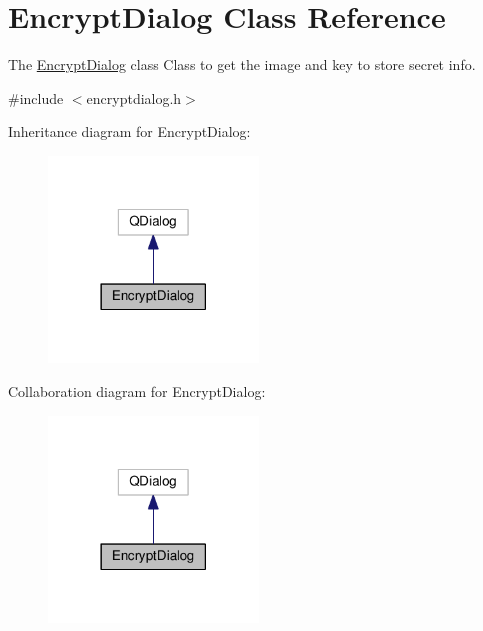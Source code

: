 \hypertarget{class_encrypt_dialog}{}\section{Encrypt\+Dialog Class Reference}
\label{class_encrypt_dialog}


The \hyperlink{class_encrypt_dialog}{Encrypt\+Dialog} class Class to get the image and key to store secret info.  




{\ttfamily \#include $<$encryptdialog.\+h$>$}



Inheritance diagram for Encrypt\+Dialog\+:
\nopagebreak
\begin{figure}[H]
\begin{center}
\leavevmode
\includegraphics[width=158pt]{class_encrypt_dialog__inherit__graph}
\end{center}
\end{figure}


Collaboration diagram for Encrypt\+Dialog\+:
\nopagebreak
\begin{figure}[H]
\begin{center}
\leavevmode
\includegraphics[width=158pt]{class_encrypt_dialog__coll__graph}
\end{center}
\end{figure}

